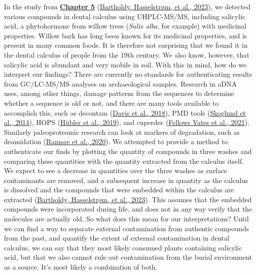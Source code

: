 \documentclass[
  b5paper,
]{book}
\begin{document}
In the study from \protect\hyperlink{mb11CalculusPilot}{\textbf{Chapter
5}} (\protect\hyperlink{ref-bartholdyMultiproxyAnalysis2023}{Bartholdy,
Hasselstrøm, et al., 2023}), we detected various compounds in dental
calculus using UHPLC-MS/MS, including salicylic acid, a phytohormone
from willow trees (\emph{Salix alba}, for example) with medicinal
properties. Willow bark has long been known for its medicinal
properties, and is present in many common foods. It is therefore not
surprising that we found it in the dental calculus of people from the
19th century. We also know, however, that salicylic acid is abundant and
very mobile in soil. With this in mind, how do we interpret our
findings? There are currently no standards for authenticating results
from GC/LC-MS/MS analyses on archaeological samples. Research in aDNA
uses, among other things, damage patterns from the sequences to
determine whether a sequence is old or not, and there are many tools
available to accomplish this, such as decontam
(\protect\hyperlink{ref-Rdecontam}{Davis et al., 2018}), PMD tools
(\protect\hyperlink{ref-skoglundSeparatingEndogenous2014}{Skoglund et
al., 2014}), HOPS
(\protect\hyperlink{ref-hublerHOPSAutomated2019}{Hübler et al., 2019}),
and cuperdec (\protect\hyperlink{ref-yatesOralMicrobiome2021}{Fellows
Yates et al., 2021}). Similarly paleoproteomic research can look at
markers of degradation, such as deamidation
(\protect\hyperlink{ref-ramsoeDeamiDATESitespecific2020}{Ramsøe et al.,
2020}). We attempted to provide a method to authenticate our finds by
plotting the quantity of compounds in three washes and comparing these
quantities with the quantity extracted from the calculus itself. We
expect to see a decrease in quantities over the three washes as surface
contaminants are removed, and a subsequent increase in quantity as the
calculus is dissolved and the compounds that were embedded within the
calculus are extracted
(\protect\hyperlink{ref-bartholdyMultiproxyAnalysis2023}{Bartholdy,
Hasselstrøm, et al., 2023}). This assumes that the embedded compounds
were incorporated during life, and does not in any way verify that the
molecules are actually old. So what does this mean for our
interpretations? Until we can find a way to separate external
contamination from authentic compounds from the past, and quantify the
extent of external contamination in dental calculus, we can say that
they most likely consumed plants containing salicylic acid, but that we
also cannot rule out contamination from the burial environment as a
source. It's most likely a combination of both.
\end{document}
